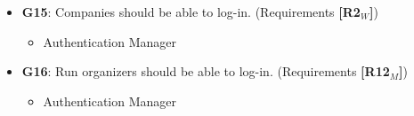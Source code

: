 \begin{itemize}
   \item \textbf{G15}: Companies should be able to log-in.
    \newline(Requirements \textbf{[R2$_W$]})
    \begin{itemize}
        \item Authentication Manager
    \end{itemize}
    
    
 \item \textbf{G16}: Run organizers should be able to log-in.
  \newline(Requirements \textbf{[R12$_M$]})
     \begin{itemize}
        \item Authentication Manager
    \end{itemize}  
   \end{itemize}
   

   
   